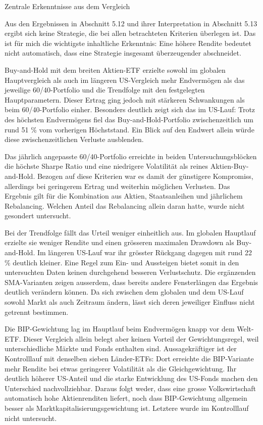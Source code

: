 \documentclass[
  ngerman,
  a4paper,
  DIV=11,
  oneside]{scrreprt}
\begin{document}
Zentrale Erkenntnisse aus dem Vergleich

Aus den Ergebnissen in Abschnitt 5.12 und ihrer Interpretation in
Abschnitt 5.13 ergibt sich keine Strategie, die bei allen betrachteten
Kriterien überlegen ist. Das ist für mich die wichtigste inhaltliche
Erkenntnis: Eine höhere Rendite bedeutet nicht automatisch, dass eine
Strategie insgesamt überzeugender abschneidet.

Buy-and-Hold mit dem breiten Aktien-ETF erzielte sowohl im globalen
Hauptvergleich als auch im längeren US-Vergleich mehr Endvermögen als
das jeweilige 60/40-Portfolio und die Trendfolge mit den festgelegten
Hauptparametern. Dieser Ertrag ging jedoch mit stärkeren Schwankungen
als beim 60/40-Portfolio einher. Besonders deutlich zeigt sich das im
US-Lauf: Trotz des höchsten Endvermögens fiel das Buy-and-Hold-Portfolio
zwischenzeitlich um rund 51 \% vom vorherigen Höchststand. Ein Blick auf
den Endwert allein würde diese zwischenzeitlichen Verluste ausblenden.

Das jährlich angepasste 60/40-Portfolio erreichte in beiden
Untersuchungsblöcken die höchste Sharpe Ratio und eine niedrigere
Volatilität als reines Aktien-Buy-and-Hold. Bezogen auf diese Kriterien
war es damit der günstigere Kompromiss, allerdings bei geringerem Ertrag
und weiterhin möglichen Verlusten. Das Ergebnis gilt für die Kombination
aus Aktien, Staatsanleihen und jährlichem Rebalancing. Welchen Anteil
das Rebalancing allein daran hatte, wurde nicht gesondert untersucht.

Bei der Trendfolge fällt das Urteil weniger einheitlich aus. Im globalen
Hauptlauf erzielte sie weniger Rendite und einen grösseren maximalen
Drawdown als Buy-and-Hold. Im längeren US-Lauf war ihr grösster Rückgang
dagegen mit rund 22 \% deutlich kleiner. Eine Regel zum Ein- und
Aussteigen bietet somit in den untersuchten Daten keinen durchgehend
besseren Verlustschutz. Die ergänzenden SMA-Varianten zeigen ausserdem,
dass bereits andere Fensterlängen das Ergebnis deutlich verändern
können. Da sich zwischen dem globalen und dem US-Lauf sowohl Markt als
auch Zeitraum ändern, lässt sich deren jeweiliger Einfluss nicht
getrennt bestimmen.

Die BIP-Gewichtung lag im Hauptlauf beim Endvermögen knapp vor dem
Welt-ETF. Dieser Vergleich allein belegt aber keinen Vorteil der
Gewichtungsregel, weil unterschiedliche Märkte und Fonds enthalten sind.
Aussagekräftiger ist der Kontrolllauf mit denselben sieben Länder-ETFs:
Dort erreichte die BIP-Variante mehr Rendite bei etwas geringerer
Volatilität als die Gleichgewichtung. Ihr deutlich höherer US-Anteil und
die starke Entwicklung des US-Fonds machen den Unterschied
nachvollziehbar. Daraus folgt weder, dass eine grosse Volkswirtschaft
automatisch hohe Aktienrenditen liefert, noch dass BIP-Gewichtung
allgemein besser als Marktkapitalisierungsgewichtung ist. Letztere wurde
im Kontrolllauf nicht untersucht.
\end{document}
